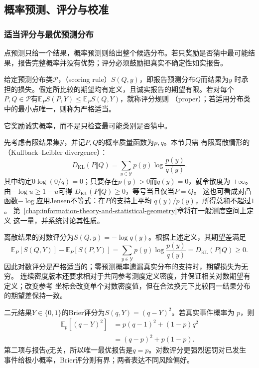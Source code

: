 \subsection{概率预测、评分与校准}
\label{sec:statistics-scoring-calibration}

\subsubsection{适当评分与最优预测分布}

点预测只给一个结果，概率预测则给出整个候选分布。若只奖励是否猜中最可能结果，报告完整概率并没有优势；评分必须鼓励把真实不确定性如实报告。
\begin{definition}[适当评分规则]
  \label{def:statistics-proper-scoring-rule}
  给定预测分布类\(\mathcal P\)，（scoring rule）\(S(Q,y)\)，即报告预测分布\(Q\)而结果为\(y\)
时承担的损失。假定所比较的期望均有定义，且诚实报告的期望有限。若对每个\(P,Q\in\mathcal P\)有\(\mathbb E_PS(P,Y)\leq\mathbb E_PS(Q,Y)\)，就称评分规则
（proper）；若适用分布类中的最小点唯一，则称为严格适当。
\end{definition}
它奖励诚实概率，而不是只检查最可能类别是否猜中。

先考虑有限结果集\(\mathcal Y\)，并记\(P,Q\)的概率质量函数为\(p,q\)。本节只需
有限离散情形的（Kullback--Leibler divergence）：
\[
  D_{\mathrm{KL}}(P\Vert Q)
  =
  \sum_{y\in\mathcal Y}p(y)\log\frac{p(y)}{q(y)}.
\]
其中约定\(0\log(0/q)=0\)；只要存在\(p(y)>0\)而\(q(y)=0\)，就令散度为
\(+\infty\)。由\(-\log u\geq1-u\)可得
\(D_{\mathrm{KL}}(P\Vert Q)\geq0\)，等号当且仅当\(P=Q\)。
这也可看成对凸函数\(-\log\)应用Jensen不等式：在\(P\)的支持上平均
\(q(y)/p(y)\)，所得总和不超过\(1\)。
第~\ref{chap:information-theory-and-statistical-geometry}章将在一般测度空间上定义
这一量，并系统讨论其性质。

离散结果的对数评分为\(S(Q,y)=-\log q(y)\)。根据上述定义，其期望差满足
\[
  \mathbb{E}_P[S(Q,Y)]-\mathbb{E}_P[S(P,Y)]
  =\sum_{y\in\mathcal Y}p(y)\log\frac{p(y)}{q(y)}
  =D_{\mathrm{KL}}(P\Vert Q)\geq0.
\]
因此对数评分是严格适当的；零预测概率遗漏真实分布的支持时，期望损失为无穷。
连续密度版本还要求相对于共同参考测度定义密度，并保证相关对数期望有定义；改变参考
坐标会改变单个对数密度值，但在合法换元下比较同一结果分布的期望差保持一致。

二元结果\(Y\in\{0,1\}\)的Brier评分为\(S(q,Y)=(q-Y)^2\)。若真实事件概率为
\(p\)，则
\begin{align}
  \mathbb{E}_p[(q-Y)^2]
  &=p(q-1)^2+(1-p)q^2\\
  &=(q-p)^2+p(1-p).
\end{align}
第二项与报告\(q\)无关，所以唯一最优报告是\(q=p\)。对数评分更强烈惩罚对已发生
事件给极小概率，Brier评分则有界；两者表达不同风险偏好。

